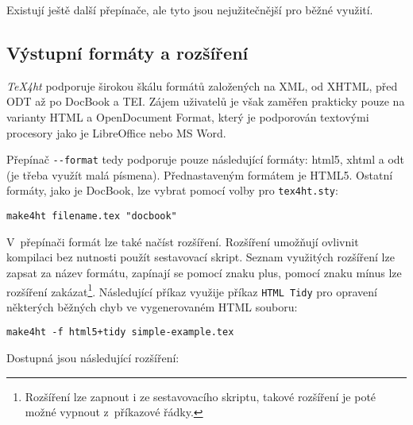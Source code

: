 \documentclass{csbulletin}
\newcommand\nazev[1]{\textit{#1}}
\newcommand\prikaz[1]{\texttt{#1}}
\newcommand\prepinac[1]{\texttt{-\/-#1}}
\begin{document}
Existují ještě další přepínače, ale tyto jsou nejužitečnější pro běžné využití.

\subsection{Výstupní formáty a rozšíření}

\nazev{TeX4ht} podporuje širokou škálu formátů založených na XML, od XHTML,
před ODT až po DocBook a TEI. Zájem uživatelů je však zaměřen prakticky pouze
na varianty HTML a OpenDocument Format, který 
je podporován textovými procesory jako je LibreOffice nebo MS Word.

Přepínač \prepinac{format} tedy podporuje pouze následující formáty: html5,
xhtml a odt (je třeba využít malá písmena). Přednastaveným formátem je HTML5.
Ostatní formáty, jako je DocBook, lze vybrat pomocí volby pro \prikaz{tex4ht.sty}:

\begin{verbatim}
make4ht filename.tex "docbook"
\end{verbatim}



V~přepínači formát lze také načíst rozšíření.  Rozšíření umožňují ovlivnit kompilaci
bez nutnosti použít sestavovací skript. 
Seznam využitých rozšíření lze zapsat za název formátu, zapínají se pomocí
znaku plus, pomocí znaku mínus lze rozšíření zakázat\footnote{Rozšíření lze
  zapnout i ze sestavovacího skriptu, takové rozšíření je poté možné vypnout
z~příkazové řádky.}. Následující příkaz využije příkaz \prikaz{HTML Tidy} pro
opravení některých běžných chyb ve vygenerovaném HTML souboru:

\begin{verbatim}
make4ht -f html5+tidy simple-example.tex
\end{verbatim}

Dostupná jsou následující rozšíření:
\end{document}
